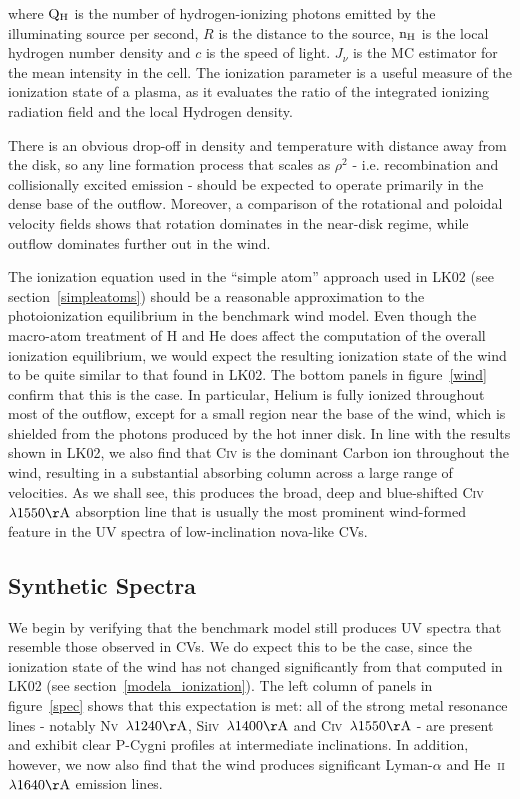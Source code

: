 \documentclass[preprint, a4paper, 11pt]{aastex}
\begin{document}
where $\rm{Q_H}$ is the number of hydrogen-ionizing photons emitted by
the illuminating source per second, $R$ is the distance to the source,
$\rm{n_H}$ is the local hydrogen number density and $c$ is the speed of
light. $J_\nu$ is the MC estimator for the mean intensity in the cell. 
The ionization parameter is a useful measure
of the ionization state of a plasma, as it evaluates the ratio 
of the integrated ionizing radiation field and the local Hydrogen density.


There is an obvious drop-off in density
and temperature with distance away from the disk, so any line
formation process that scales as $\rho^2$ - i.e. recombination and
collisionally excited emission - should be expected to operate
primarily in the dense base of the outflow. Moreover, a comparison of
the rotational and poloidal velocity fields shows that rotation
dominates in the near-disk regime, while outflow dominates further out
in the wind. 

The ionization equation used in the ``simple atom'' approach used in
LK02 (see section~\ref{simpleatoms}) should be a reasonable approximation to
the photoionization equilibrium in the benchmark wind model. Even
though the macro-atom treatment of H and He does affect the 
computation of the overall ionization equilibrium, we would expect the
resulting ionization state of the wind to be quite similar to that
found in LK02. The bottom panels in figure~\ref{wind} confirm that this
is the case. In particular, Helium is fully ionized
throughout most of the outflow, except for a small region near the
base of the wind, which is shielded from the photons produced by the
hot inner disk. In line with the results shown in LK02, we also find
that C\textsc{iv} is the dominant Carbon ion throughout the wind,
resulting in a substantial absorbing column across a large range of
velocities. As we shall see, this produces the broad, deep and
blue-shifted C\textsc{iv}~$\lambda 1550{\rm \AA}$ absorption line that
is usually the most prominent wind-formed feature in the UV spectra of
low-inclination nova-like CVs.

\subsection{Synthetic Spectra}
\label{modela_spectrum}

We begin by verifying that the benchmark model still produces UV
spectra that resemble those observed in CVs. We do expect this to be
the case, since the ionization state of the wind has not changed
significantly from that computed in LK02 (see section~\ref{modela_ionization}). 
The left column of panels in figure~\ref{spec} shows that this expectation
is met: all of the strong metal resonance
lines - notably N\textsc{v}~$\lambda 1240{\rm \AA}$,
Si\textsc{iv}~$\lambda 1400{\rm \AA}$ and C\textsc{iv}~$\lambda
1550{\rm \AA}$ - are present and exhibit clear P-Cygni profiles
at intermediate inclinations. In addition, however, we now also find
that the wind produces significant Lyman-$\alpha$ and
He~\textsc{ii}~$\lambda1640{\rm \AA}$ emission lines. 
\end{document}
